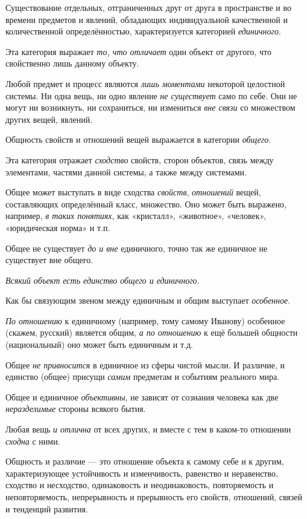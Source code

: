 \documentclass[a4paper,14pt,russian]{extreport}
\begin{document}
Существование отдельных, отграниченных друг от друга в пространстве и во времени предметов и явлений, обладающих индивидуальной качественной и количественной определённостью, характеризуется категорией \emph{единичного}.

Эта категория выражает \emph{то, что отличает} один объект от другого, что свойственно лишь данному объекту.

Любой предмет и процесс являются \emph{лишь моментами} некоторой целостной системы. Ни одна вещь, ни одно явление \emph{не существует} само по себе. Они не могут ни возникнуть, ни сохраниться, ни измениться \emph{вне связи} со множеством других вещей, явлений.

Общность свойств и отношений вещей выражается в категории \emph{общего}.

Эта категория отражает \emph{сходство} свойств, сторон объектов, связь между элементами, частями данной системы, а также между системами.

Общее может выступать в виде сходства \emph{свойств}, \emph{отношений} вещей, составляющих определённый класс, множество. Оно может быть выражено, например, \emph{в таких понятиях}, как «кристалл», «животное», «человек», «юридическая норма» и т.п.

Общее не существует \emph{до и вне} единичного, точно так же единичное не существует вне общего.

\emph{Всякий объект есть единство общего и единичного}.

Как бы связующим звеном между единичным и общим выступает \emph{особенное}.

\emph{По отношению} к единичному (например, тому самому Иванову) особенное (скажем, русский) является общим, \emph{а по отношению} к ещё большей общности (национальный) оно может быть единичным и т.д.

Общее \emph{не привносится} в единичное из сферы чистой мысли. И различие, и единство (общее) присущи \emph{самим} предметам и событиям реального мира.

Общее и единичное \emph{объективны}, не зависят от сознания человека как две \emph{неразделимые} стороны всякого бытия.

Любая вещь \emph{и отлична} от всех других, и вместе с тем в каком-то отношении \emph{сходна} с ними.

Общность и различие --- это отношение объекта к самому себе и к другим, характеризующее устойчивость и изменчивость, равенство и неравенство, сходство и несходство, одинаковость и неодинаковость, повторяемость и неповторяемость, непрерывность и прерывность его свойств, отношений, связей и тенденций развития.
\end{document}
